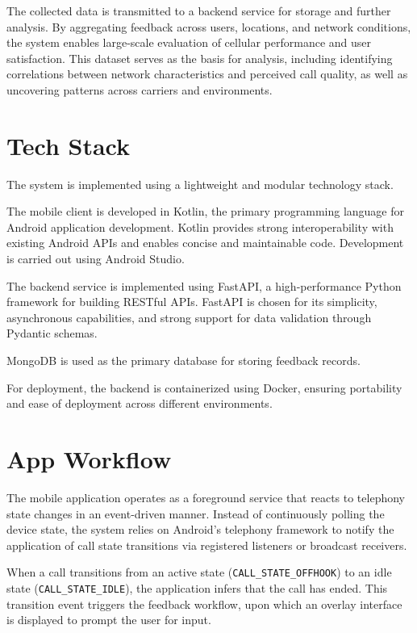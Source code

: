 \documentclass{article}
\theoremstyle{plain}
\theoremstyle{definition}
\theoremstyle{remark}
\begin{document}
The collected data is transmitted to a backend service for storage and further analysis. By aggregating feedback across users, locations, and network conditions, the system enables large-scale evaluation of cellular performance and user satisfaction. This dataset serves as the basis for analysis, including identifying correlations between network characteristics and perceived call quality, as well as uncovering patterns across carriers and environments.


\section{Tech Stack}

The system is implemented using a lightweight and modular technology stack.

The mobile client is developed in Kotlin, the primary programming language for Android application development. Kotlin provides strong interoperability with existing Android APIs and enables concise and maintainable code. Development is carried out using Android Studio.

The backend service is implemented using FastAPI, a high-performance Python framework for building RESTful APIs. FastAPI is chosen for its simplicity, asynchronous capabilities, and strong support for data validation through Pydantic schemas. 

MongoDB is used as the primary database for storing feedback records.

For deployment, the backend is containerized using Docker, ensuring portability and ease of deployment across different environments.

\section{App Workflow}

The mobile application operates as a foreground service that reacts to telephony state changes in an event-driven manner. Instead of continuously polling the device state, the system relies on Android’s telephony framework to notify the application of call state transitions via registered listeners or broadcast receivers.

When a call transitions from an active state (\texttt{CALL\_STATE\_OFFHOOK}) to an idle state (\texttt{CALL\_STATE\_IDLE}), the application infers that the call has ended. This transition event triggers the feedback workflow, upon which an overlay interface is displayed to prompt the user for input.
\end{document}
